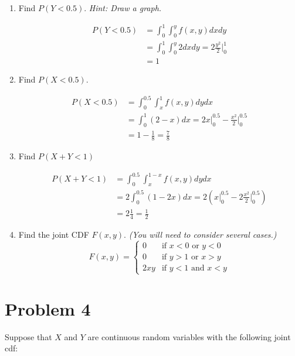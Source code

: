 \documentclass{article}
\newcommand{\1}{\mathbf{1}}
\begin{document}
\begin{enumerate}
    \item Find $P(Y<0.5)$. {\it Hint: Draw a graph.}  

    \begin{align*}
        P(Y<0.5) &= \int_0^1 \int_0^y f(x,y)dxdy \\
        &= \int_0^1 \int_0^y 2 dxdy = 2 \frac{y^2}{2}\bigg |_0^1 \\
        &= 1
    \end{align*}


    \item Find $P(X<0.5)$. 
    
    \begin{align*}
        P(X<0.5) &= \int_0^{0.5}\int_x^1 f(x,y)dydx \\
        &= \int_0^1 (2-x) dx = 2x|_0^{0.5} -  \frac{x^2}{2}\bigg |_0^{0.5} \\
        &= 1 - \frac{1}{8} = \frac{7}{8}
    \end{align*}
    
    
    \item Find $P(X+Y < 1)$ 
    
    \begin{align*}
        P(X+Y<1) &= \int_0^{0.5}\int_x^{1-x} f(x,y)dydx \\
        &= 2\int_0^{0.5} (1-2x) dx = 2\left(x|_0^{0.5} -  2\frac{x^2}{2}\bigg |_0^{0.5}\right) \\
        &= 2\frac{1}{4} = \frac{1}{2}
    \end{align*}
        
    
    \item Find the joint CDF $F(x,y)$. {\it (You will need to consider several cases.)}  
    $$F(x,y) = \begin{cases} 
	        0   &\mbox{if } x < 0 \mbox{ or } y<0   \\
	        0   &\mbox{if } y > 1 \mbox{ or } x > y \\
            2xy &\mbox{if } y < 1 \mbox{ and } x<y
        \end{cases}  
    $$
\end{enumerate}




\newpage
\section*{Problem 4} 
Suppose that $X$ and $Y$ are continuous random variables with the following joint cdf:
\end{document}
